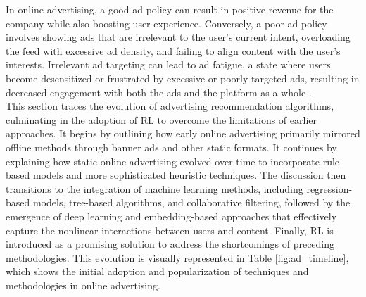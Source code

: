 \documentclass[final]{anthology-ch}         %
\begin{document}
In online advertising, a good ad policy can result in positive revenue for the company while also boosting user experience. Conversely, a poor ad policy involves showing ads that are irrelevant to the user’s current intent, overloading the feed with excessive ad density, and failing to align content with the user’s interests. Irrelevant ad targeting can lead to ad fatigue, a state where users become desensitized or frustrated by excessive or poorly targeted ads, resulting in decreased engagement with both the ads and the platform as a whole \cite{ccelik2023ad}. \\

This section traces the evolution of advertising recommendation algorithms, culminating in the adoption of RL to overcome the limitations of earlier approaches. It begins by outlining how early online advertising primarily mirrored offline methods through banner ads and other static formats. It continues by explaining how static online advertising evolved over time to incorporate rule-based models and more sophisticated heuristic techniques. The discussion then transitions to the integration of machine learning methods, including regression-based models, tree-based algorithms, and collaborative filtering, followed by the emergence of deep learning and embedding-based approaches that effectively capture the nonlinear interactions between users and content. Finally, RL is introduced as a promising solution to address the shortcomings of preceding methodologies. This evolution is visually represented in Table \ref{fig:ad_timeline}, which shows the initial adoption and popularization of techniques and methodologies in online advertising. \\
\end{document}
